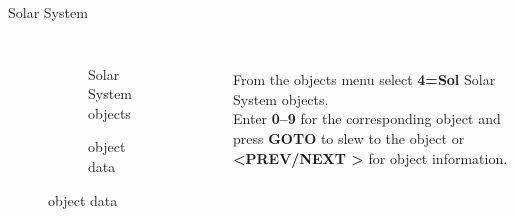 
\begin{frame}[t]{Solar System}
  \begin{columns}[T]
    \begin{figure}[ht]
        \begin{subfigure}{0.67\textwidth}
        \caption{Solar System objects}
      \end{subfigure}
      \vspace{\fill}
      \begin{subfigure}{0.67\textwidth}
        \caption{object data}
      \end{subfigure}
    \end{figure}
  \large
  \ \\[0.25ex]
  From the objects menu select \textbf{4=Sol} Solar System objects.\\[1ex]

  Enter \textbf{0--9} for the corresponding object and press \textbf{GOTO} to
  slew to the object or \textbf{\textless PREV/NEXT \textgreater} for object
  information. \\[1ex]
\end{columns}
\end{frame}


